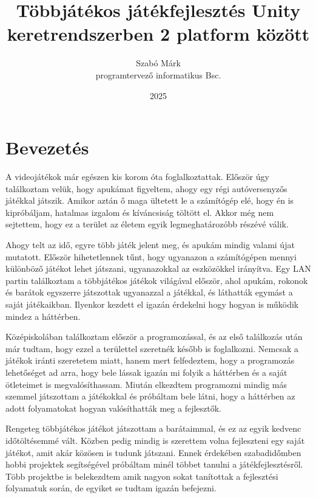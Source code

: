 \documentclass[]{thesis-ekf}
\theoremstyle{definition}
\theoremstyle{remark}
\begin{document}
\title{Többjátékos játékfejlesztés Unity keretrendszerben 2 platform között}
\author{Szabó Márk\\programtervező informatikus Bsc.}
\date{2025}
\maketitle

\tableofcontents

\chapter*{Bevezetés}

A videojátékok már egészen kis korom óta foglalkoztattak. Először úgy találkoztam velük, hogy apukámat figyeltem, ahogy egy régi autóversenyzős játékkal játszik. Amikor aztán ő maga ültetett le a számítógép elé, hogy én is kipróbáljam, hatalmas izgalom és kíváncsiság töltött el. Akkor még nem sejtettem, hogy ez a terület az életem egyik legmeghatározóbb részévé válik.

Ahogy telt az idő, egyre több játék jelent meg, és apukám mindig valami újat mutatott. Először hihetetlennek tűnt, hogy ugyanazon a számítógépen mennyi különböző játékot lehet játszani, ugyanazokkal az eszközökkel irányítva. Egy LAN partin találkoztam a többjátékos játékok világával először, ahol apukám, rokonok és barátok egyszerre játszottak ugyanazzal a játékkal, és láthatták egymást a saját játékaikban. Ilyenkor kezdett el igazán érdekelni hogy hogyan is működik mindez a háttérben. 

Középiskolában találkoztam először a programozással, és az első találkozás után már tudtam, hogy ezzel a területtel szeretnék később is foglalkozni. Nemcsak a játékok iránti szeretetem miatt, hanem mert felfedeztem, hogy a programozás lehetőséget ad arra, hogy bele lássak igazán mi folyik a háttérben és a saját ötleteimet is megvalósíthassam. Miután elkezdtem programozni mindig más szemmel játszottam a játékokkal és próbáltam bele látni, hogy a háttérben az adott folyamatokat hogyan valósíthatták meg a fejlesztők.

Rengeteg többjátékos játékot játszottam a barátaimmal, és ez az egyik kedvenc időtöltésemmé vált. Közben pedig mindig is szerettem volna fejleszteni egy saját játékot, amit akár közösen is tudunk játszani. Ennek érdekében szabadidőmben hobbi projektek segítségével próbáltam minél többet tanulni a játékfejlesztésről. Több projektbe is belekezdtem amik nagyon sokat tanítottak a fejlesztési folyamatuk során, de egyiket se tudtam igazán befejezni.
\end{document}
